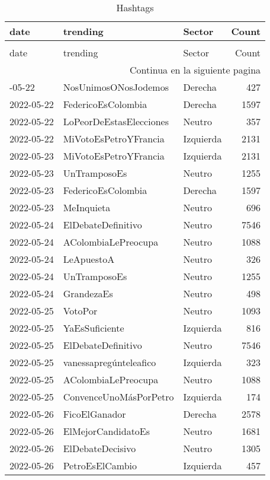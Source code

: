 
\begin{longtable}{lllr}
\caption{Hashtags} \label{table:hashtags} \\
\toprule
date & trending & Sector & Count \\
\midrule
\endfirsthead
\caption[]{Hashtags} \\
\toprule
date & trending & Sector & Count \\
\midrule
\endhead
\midrule
\multicolumn{4}{r}{Continua en la siguiente pagina} \\
\midrule
\endfoot
\bottomrule
\endlastfoot
2022-05-22 & NosUnimosONosJodemos & Derecha & 427 \\
2022-05-22 & FedericoEsColombia & Derecha & 1597 \\
2022-05-22 & LoPeorDeEstasElecciones & Neutro & 357 \\
2022-05-22 & MiVotoEsPetroYFrancia & Izquierda & 2131 \\
2022-05-23 & MiVotoEsPetroYFrancia & Izquierda & 2131 \\
2022-05-23 & UnTramposoEs & Neutro & 1255 \\
2022-05-23 & FedericoEsColombia & Derecha & 1597 \\
2022-05-23 & MeInquieta & Neutro & 696 \\
2022-05-24 & ElDebateDefinitivo & Neutro & 7546 \\
2022-05-24 & AColombiaLePreocupa & Neutro & 1088 \\
2022-05-24 & LeApuestoA & Neutro & 326 \\
2022-05-24 & UnTramposoEs & Neutro & 1255 \\
2022-05-24 & GrandezaEs & Neutro & 498 \\
2022-05-25 & VotoPor & Neutro & 1093 \\
2022-05-25 & YaEsSuficiente & Izquierda & 816 \\
2022-05-25 & ElDebateDefinitivo & Neutro & 7546 \\
2022-05-25 & vanessapregúnteleafico & Izquierda & 323 \\
2022-05-25 & AColombiaLePreocupa & Neutro & 1088 \\
2022-05-25 & ConvenceUnoMásPorPetro & Izquierda & 174 \\
2022-05-26 & FicoElGanador & Derecha & 2578 \\
2022-05-26 & ElMejorCandidatoEs & Neutro & 1681 \\
2022-05-26 & ElDebateDecisivo & Neutro & 1305 \\
2022-05-26 & PetroEsElCambio & Izquierda & 457 \\

\end{longtable}
